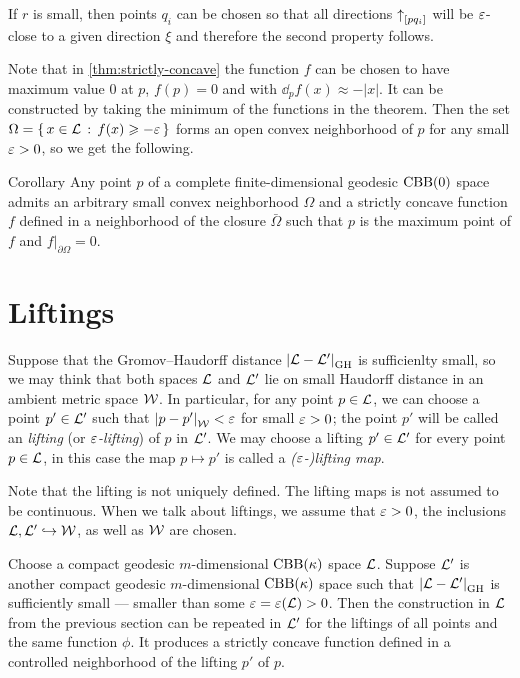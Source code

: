 If $r$ is small, then points $q_i$ can be chosen so that all directions
${\uparrow}_{[{p}{q_i}]}$ will be $\varepsilon$-close to a given direction $\xi$ and
therefore the second property follows.
\qeds

Note that in \ref{thm:strictly-concave} the function $f$ can be chosen to have maximum value $0$ at $p$,
$f(p)=0$ and with $\dd_p f(x)\approx-|x|$.
It can be constructed by taking the minimum of the functions in the theorem.
Then the set $\Omega=\left\{\,{x\in\mathcal{L}}\,:\,{f(x)\geqslant -\varepsilon}\,\right\}$ forms an open convex neighborhood of $p$ for any small $\varepsilon>0$, so we get the following.


\begin{thm}{Corollary}\label{cor:convex-nbhd}
Any point $p$ of a complete finite-dimensional geodesic $\mathrm{CBB}(0)$ space admits an arbitrary small convex neighborhood $\Omega$ and a strictly concave function $f$ defined in a neighborhood of the closure $\bar\Omega$ such that $p$ is the maximum point of $f$
and $f|_{\partial\Omega}=0$.
\end{thm}

\section{Liftings}

Suppose that the Gromov--Haudorff distance $\dist{\spc{L}}{\spc{L}'}{\GH}$ is sufficienlty small, so we may think that both spaces $\mathcal{L}$ and $\mathcal{L}'$ lie on small Haudorff distance in an ambient metric space $\mathcal{W}$.
In particular, for any point $p\in \mathcal{L}$, we can choose a point $p'\in \mathcal{L}'$ such that $\dist{p}{p'}{\spc{W}}<\eps$ for small $\varepsilon>0$;
the point $p'$ will be called an \emph{lifting} (or \emph{$\varepsilon$-lifting}) of $p$ in $\mathcal{L}'$.
We may choose a lifting $p'\in\mathcal{L}'$ for every point $p\in\mathcal{L}$, 
in this case the map $p\mapsto p'$ is called a {}\emph{($\varepsilon$-)lifting map}.

Note that the lifting is not uniquely defined.
The lifting maps is not assumed to be continuous.
When we talk about liftings, we assume that $\varepsilon>0$, the inclusions $\mathcal{L},\mathcal{L}'\hookrightarrow\mathcal{W}$,
as well as $\mathcal{W}$ are chosen.


Choose a compact geodesic $m$-dimensional $\mathrm{CBB}(\kappa)$ space $\mathcal{L}$.
Suppose $\mathcal{L}'$ is another compact geodesic $m$-dimensional $\mathrm{CBB}(\kappa)$ space such that $\dist{\spc{L}}{\spc{L}'}{\GH}$ is sufficiently small --- smaller than some $\varepsilon=\varepsilon(\mathcal{L})>0$.
Then the construction in $\mathcal{L}$ from the previous section  
can be repeated in $\mathcal{L}'$ for the liftings of all points and the same function $\phi$.
It produces a strictly concave function defined in a controlled neighborhood of the lifting $p'$ of $p$.

